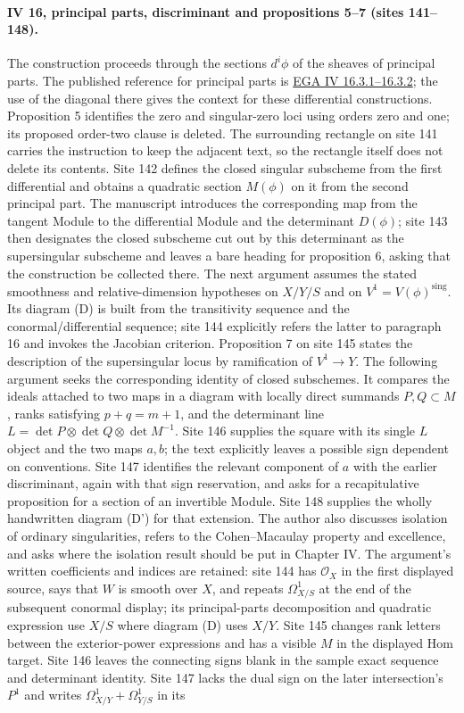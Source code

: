 \documentclass[10pt,a4paper]{article}
\begin{document}
\paragraph{IV 16, principal parts, discriminant and propositions 5--7 (sites 141--148).}
The construction proceeds through the sections $d^i\phi$ of the sheaves of principal parts. The published reference for principal parts is \href{https://www.numdam.org/articles/10.1007/BF02732123/}{EGA IV 16.3.1--16.3.2}; the use of the diagonal there gives the context for these differential constructions. Proposition 5 identifies the zero and singular-zero loci using orders zero and one; its proposed order-two clause is deleted. The surrounding rectangle on site 141 carries the instruction to keep the adjacent text, so the rectangle itself does not delete its contents. Site 142 defines the closed singular subscheme from the first differential and obtains a quadratic section $M(\phi)$ on it from the second principal part. The manuscript introduces the corresponding map from the tangent Module to the differential Module and the determinant $D(\phi)$; site 143 then designates the closed subscheme cut out by this determinant as the supersingular subscheme and leaves a bare heading for proposition 6, asking that the construction be collected there. The next argument assumes the stated smoothness and relative-dimension hypotheses on $X/Y/S$ and on $V^1=V(\phi)^{\mathrm{sing}}$. Its diagram (D) is built from the transitivity sequence and the conormal/differential sequence; site 144 explicitly refers the latter to paragraph 16 and invokes the Jacobian criterion. Proposition 7 on site 145 states the description of the supersingular locus by ramification of $V^1\longrightarrow Y$. The following argument seeks the corresponding identity of closed subschemes. It compares the ideals attached to two maps in a diagram with locally direct summands $P,Q\subset M$, ranks satisfying $p+q=m+1$, and the determinant line $L=\det P\otimes\det Q\otimes\det M^{-1}$. Site 146 supplies the square with its single $L$ object and the two maps $a,b$; the text explicitly leaves a possible sign dependent on conventions. Site 147 identifies the relevant component of $a$ with the earlier discriminant, again with that sign reservation, and asks for a recapitulative proposition for a section of an invertible Module. Site 148 supplies the wholly handwritten diagram (D') for that extension. The author also discusses isolation of ordinary singularities, refers to the Cohen--Macaulay property and excellence, and asks where the isolation result should be put in Chapter IV. The argument's written coefficients and indices are retained: site 144 has $\mathcal O_X$ in the first displayed source, says that $W$ is smooth over $X$, and repeats $\Omega^1_{X/S}$ at the end of the subsequent conormal display; its principal-parts decomposition and quadratic expression use $X/S$ where diagram (D) uses $X/Y$. Site 145 changes rank letters between the exterior-power expressions and has a visible $M$ in the displayed Hom target. Site 146 leaves the connecting signs blank in the sample exact sequence and determinant identity. Site 147 lacks the dual sign on the later intersection's $P^1$ and writes $\Omega^1_{X/Y}+\Omega^1_{Y/S}$ in its 
\end{document}
